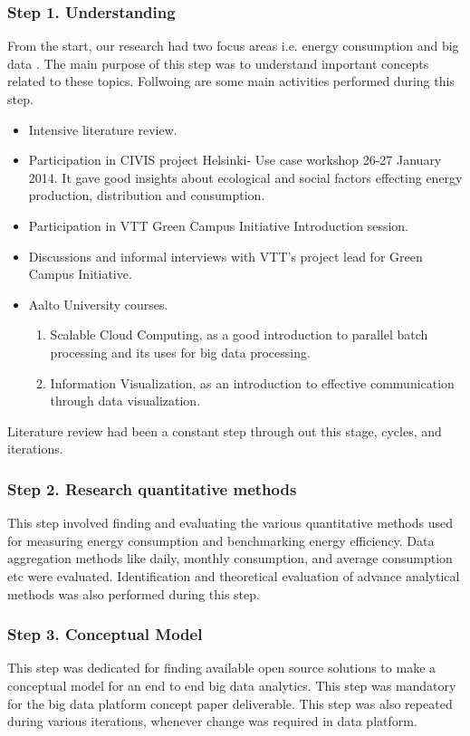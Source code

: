 \subsubsection{Step 1. Understanding} 
From the start, our research had two focus areas i.e. energy consumption and big data . The main purpose of this step was to understand important concepts related to these topics. Follwoing are some main activities performed during this step.
\begin{itemize}
\item Intensive literature review.
\item Participation in CIVIS project Helsinki- Use case workshop 26-27 January 2014. It gave good insights about ecological and social factors effecting energy production, distribution and consumption.
\item Participation in VTT Green Campus Initiative Introduction session.
\item Discussions and informal interviews with VTT's project lead for Green Campus Initiative.
\item Aalto University courses.
	\begin{enumerate}
	    \item Scalable Cloud Computing, as a good introduction to parallel batch processing and its uses for big data processing.
	    \item Information Visualization, as an introduction to effective communication through data visualization.
	  \end{enumerate}      
\end{itemize}

Literature review had been a constant step through out this stage, cycles, and iterations.
\subsubsection{Step 2. Research quantitative methods} \label{qm}
This step involved finding and evaluating the various quantitative methods used for measuring energy consumption and benchmarking energy efficiency. Data aggregation methods like daily, monthly consumption, and average consumption etc were evaluated. Identification and theoretical evaluation of advance analytical methods was also performed during this step.
\subsubsection{Step 3. Conceptual Model}\label{cmodel}
This step was dedicated for finding available open source solutions to make a conceptual model for an end to end big data analytics. This step was mandatory for the big data platform concept paper deliverable. This step was also repeated during various iterations, whenever change was required in data platform.
